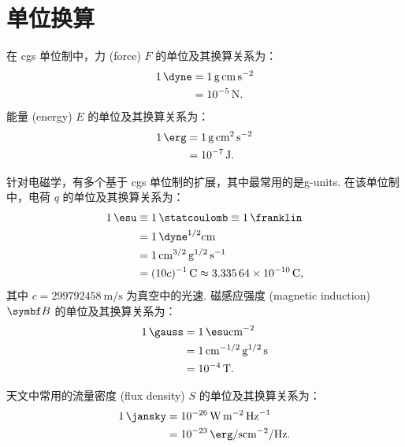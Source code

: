 
\chapter{单位换算}
\label{chap:units}

在 \ac{cgs} 单位制中，力 (force) $F$ 的单位及其换算关系为：
\begin{align}
  \label{eq:cgs-force}
  \SI{1}{\dyne}
    & = \SI{1}{\gram \cm \second\tothe{-2}} \\
    & = \SI{e-5}{\newton} .
\end{align}
能量 (energy) $E$ 的单位及其换算关系为：
\begin{align}
  \label{eq:cgs-work}
  \SI{1}{\erg}
    & = \SI{1}{\gram \cm\tothe{2} \second\tothe{-2}} \\
    & = \SI{e-7}{\joule} .
\end{align}

针对电磁学，有多个基于 \ac{cgs} 单位制的扩展，其中最常用的是\ac{g-units}.
在该单位制中，电荷 $q$ 的单位及其换算关系为：
\begin{align}
  \label{eq:gu-electrical-charge}
  \SI{1}{\esu}
    & \equiv \SI{1}{\statcoulomb} \equiv \SI{1}{\franklin} \\
    & = \SI{1}{\dyne\tothe{1/2} \cm} \\
    & = \SI{1}{\cm\tothe{3/2} \gram\tothe{1/2} \per\second} \\
    & = (10 c)^{-1}\,\si{\coulomb} \approx \SI{3.33564e-10}{\coulomb} ,
\end{align}
其中 $c = \SI{299792458}{\meter\per\second} $ 为真空中的光速.
磁感应强度 (magnetic induction) $\B{B}$ 的单位及其换算关系为：
\begin{align}
  \label{eq:gu-b-field}
  \SI{1}{\gauss}
    & = \SI{1}{\esu \cm\tothe{-2}} \\
    & = \SI{1}{\cm\tothe{-1/2} \gram\tothe{1/2} \second} \\
    & = \SI{e-4}{\tesla} .
\end{align}

天文中常用的流量密度 (flux density) $S$ 的单位及其换算关系为：
\begin{align}
  \label{eq:jy-conv}
  \SI{1}{\jansky}
    & = \SI{e-26}{\watt \meter\tothe{-2} \per\hertz} \\
    & = \SI{e-23}{\erg \per\second \cm\tothe{-2} \per\hertz} .
\end{align}


